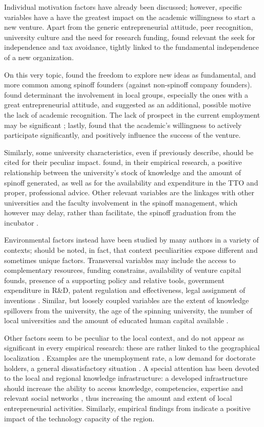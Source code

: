 Individual motivation factors have already been discussed; however, specific variables have a have the greatest impact on the academic willingness to start a new venture. Apart from the generic entrepreneurial attitude, peer recognition, university culture and the need for research funding, \citet{Rizzo2015} found relevant the seek for independence and tax avoidance, tightly linked to the fundamental independence of a new organization. 

On this very topic, \citet{Perez2003} found the freedom to explore new ideas as fundamental, and more common among spinoff founders (against non-spinoff company founders). \citet{Siegel2007} found determinant the involvement in local groups, especially the ones with a great entrepreneurial attitude, and suggested as an additional, possible motive the lack of academic recognition. The lack of prospect in the current employment may be significant \citep{Rizzo2015}; lastly, \citet{Ittelson2002} found that the academic's willingness to actively participate significantly, and positively influence the success of the venture.

Similarly,  some university characteristics, even if previously describe, should be cited for their peculiar impact. \citet{Lockett2005a} found, in their empirical research, a positive relationship between the university's stock of knowledge and the amount of spinoff generated, as well as for the availability and expenditure in the TTO and proper, professional advice. Other relevant variables are the linkages with other universities and the faculty involvement in the spinoff management, which however may delay, rather than facilitate, the spinoff graduation from the incubator \citep{Rothaermel2005}.

Environmental factors instead have been studied by many authors in a variety of contexts; should be noted, in fact, that context peculiarities expose different and sometimes unique factors. Transversal variables may include the access to complementary resources, funding constrains, availability of venture capital founds, presence of a supporting policy and relative tools, government expenditure in R\&D, patent regulation and effectiveness, legal assignment of inventions \citep{OShea2004, Fini2009, Rizzo2015}. Similar, but loosely coupled variables are the extent of knowledge spillovers from the university, the age of the spinning university, the number of local universities and the amount of educated human capital available \citep{Audretsch2005}.

Other factors seem to be peculiar to the local context, and do not appear as significant in every empirical research: these are rather linked to the geographical localization \citep{OShea2004}. Examples are the unemployment rate, a low demand for doctorate holders, a general dissatisfactory situation \citep{Rizzo2015}. A special attention has been devoted to the local and regional knowledge infrastructure: a developed infrastructure should increase the ability to access knowledge, competencies, expertise and relevant social networks \citep{OShea2004}, thus increasing the amount and extent of local entrepreneurial activities. Similarly, empirical findings from \citet{Audretsch2005} indicate a positive impact of the technology capacity of the region.

